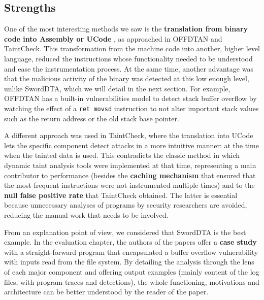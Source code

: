 \documentclass[10pt,a4paper,english,onecolumn]{IEEEtran}
\begin{document}
\subsection{Strengths}

One of the most interesting methods we saw is the \textbf{translation from binary code into Assembly or UCode} , as approached in OFFDTAN and TaintCheck. This transformation from the machine code into another, higher level language, reduced the instructions whose functionality needed to be understood and ease the instrumentation process. At the same time, another advantage was that the malicious activity of the binary was detected at this low enough level, unlike SwordDTA, which we will detail in the next section. For example, OFFDTAN has a built-in vulnerabilities model to detect stack buffer overflow by watching the effect of a \texttt{ret movsd} instruction to not alter important stack values such as the return address or the old stack base pointer.

A different approach was used in TaintCheck, where the translation into UCode lets the specific component detect attacks in a more intuitive manner: at the time when the tainted data is used. This contradicts the classic method in which dynamic taint analysis tools were implemented at that time, representing a main contributor to performance (besides the \textbf{caching mechanism} that ensured that the most frequent instructions were not instrumented multiple times) and to the \textbf{null false positive rate} that TaintCheck obtained. The latter is essential because unnecessary analyses of programs by security researchers are avoided, reducing the manual work that needs to be involved.

From an explanation point of view, we considered that SwordDTA is the best example. In the evaluation chapter, the authors of the papers offer a \textbf{case study} with a straight-forward program that encapsulated a buffer overflow vulnerability with inputs read from the file system. By detailing the analysis through the lens of each major component and offering output examples (mainly content of the log files, with program traces and detections), the whole functioning, motivations and architecture can be better understood by the reader of the paper.
\end{document}
